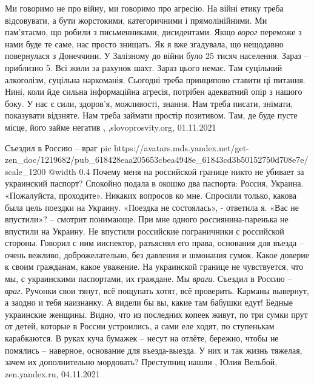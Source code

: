 Ми говоримо не про війну, ми говоримо про агресію. На війні етику треба
відсовувати, а бути жорстокими, категоричними і прямолінійними. Ми пам’ятаємо,
що робили з письменниками, дисидентами. Якщо \emph{ворог} переможе з нами буде те
саме, нас просто знищать.  Як я вже згадувала, що нещодавно повернулася з
Донеччини. У Залізному до війни було 25 тисяч населення. Зараз – приблизно 5.
Всі жили за рахунок шахт. Зараз цього немає. Там суцільний алкоголізм, суцільна
наркоманія. Сьогодні треба принципово ставити ці питання. Нині, коли йде сильна
інформаційна агресія, потрібен адекватний опір з нашого боку.  У нас є сили,
здоров’я, можливості, знання. Нам треба писати, знімати, показувати відзняте.
Нам треба займати простір позитивом. Там, де буде пусте місце, його займе
негатив
, ,slovoprosvity.org, 01.11.2021

Съездил в Россию – враг
\ifcmt
  pic https://avatars.mds.yandex.net/get-zen_doc/1219682/pub_618428eaa205653cbea4948e_61843cd3b50152750d708e7e/scale_1200
  @width 0.4
\fi
Почему меня на российской границе никто не убивает за украинский паспорт?
Спокойно подала в окошко два паспорта: Россия, Украина. «Пожалуйста,
проходите». Никаких вопросов ко мне. Спросили только, какова была цель поездки
на Украину. «Поездка не состоялась», - ответила я. «Вас не впустили»? – смотрит
понимающе.  При мне одного россиянина-паренька не впустили на Украину. Не
впустили российские пограничники с российской стороны. Говорил с ним инспектор,
разъяснял его права, основания для въезда – очень вежливо, доброжелательно, без
давления и шмонания сумок. Какое доверие к своим гражданам, какое уважение.  На
украинской границе не чувствуется, что мы, с украинскими паспортами, их
граждане. Мы \emph{враги}. Съездил в Россию – \emph{враг}. Ручонки свои тянут, всё пощупать
хотят, всё проверить. Карманы вывернут, а заодно и тебя наизнанку.  А видели бы
вы, какие там бабушки едут! Бедные украинские женщины. Видно, что из последних
копеек живут, по три сумки прут от детей, которые в России устроились, а сами
еле ходят, по ступенькам карабкаются. В руках куча бумажек – несут на отлёте,
бережно, чтобы не помялись – наверное, основание для въезда-выезда. У них и так
жизнь тяжелая, зачем их дополнительно мордовать? Преступниц нашли
, Юлия Вельбой, zen.yandex.ru, 04.11.2021
